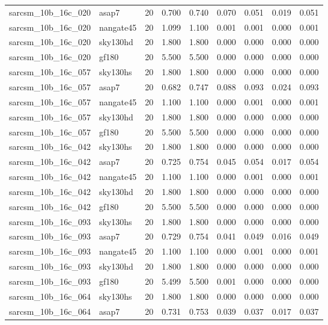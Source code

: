\begin{tabular}{llrrrrrrr}
sarcsm\_10b\_16c\_020 & asap7 & 20 & 0.700 & 0.740 & 0.070 & 0.051 & 0.019 & 0.051 \\
sarcsm\_10b\_16c\_020 & nangate45 & 20 & 1.099 & 1.100 & 0.001 & 0.001 & 0.000 & 0.001 \\
sarcsm\_10b\_16c\_020 & sky130hd & 20 & 1.800 & 1.800 & 0.000 & 0.000 & 0.000 & 0.000 \\
sarcsm\_10b\_16c\_020 & gf180 & 20 & 5.500 & 5.500 & 0.000 & 0.000 & 0.000 & 0.000 \\
sarcsm\_10b\_16c\_057 & sky130hs & 20 & 1.800 & 1.800 & 0.000 & 0.000 & 0.000 & 0.000 \\
sarcsm\_10b\_16c\_057 & asap7 & 20 & 0.682 & 0.747 & 0.088 & 0.093 & 0.024 & 0.093 \\
sarcsm\_10b\_16c\_057 & nangate45 & 20 & 1.100 & 1.100 & 0.000 & 0.001 & 0.000 & 0.001 \\
sarcsm\_10b\_16c\_057 & sky130hd & 20 & 1.800 & 1.800 & 0.000 & 0.000 & 0.000 & 0.000 \\
sarcsm\_10b\_16c\_057 & gf180 & 20 & 5.500 & 5.500 & 0.000 & 0.000 & 0.000 & 0.000 \\
sarcsm\_10b\_16c\_042 & sky130hs & 20 & 1.800 & 1.800 & 0.000 & 0.000 & 0.000 & 0.000 \\
sarcsm\_10b\_16c\_042 & asap7 & 20 & 0.725 & 0.754 & 0.045 & 0.054 & 0.017 & 0.054 \\
sarcsm\_10b\_16c\_042 & nangate45 & 20 & 1.100 & 1.100 & 0.000 & 0.001 & 0.000 & 0.001 \\
sarcsm\_10b\_16c\_042 & sky130hd & 20 & 1.800 & 1.800 & 0.000 & 0.000 & 0.000 & 0.000 \\
sarcsm\_10b\_16c\_042 & gf180 & 20 & 5.500 & 5.500 & 0.000 & 0.000 & 0.000 & 0.000 \\
sarcsm\_10b\_16c\_093 & sky130hs & 20 & 1.800 & 1.800 & 0.000 & 0.000 & 0.000 & 0.000 \\
sarcsm\_10b\_16c\_093 & asap7 & 20 & 0.729 & 0.754 & 0.041 & 0.049 & 0.016 & 0.049 \\
sarcsm\_10b\_16c\_093 & nangate45 & 20 & 1.100 & 1.100 & 0.000 & 0.001 & 0.000 & 0.001 \\
sarcsm\_10b\_16c\_093 & sky130hd & 20 & 1.800 & 1.800 & 0.000 & 0.000 & 0.000 & 0.000 \\
sarcsm\_10b\_16c\_093 & gf180 & 20 & 5.499 & 5.500 & 0.001 & 0.000 & 0.000 & 0.000 \\
sarcsm\_10b\_16c\_064 & sky130hs & 20 & 1.800 & 1.800 & 0.000 & 0.000 & 0.000 & 0.000 \\
sarcsm\_10b\_16c\_064 & asap7 & 20 & 0.731 & 0.753 & 0.039 & 0.037 & 0.017 & 0.037 \\

\end{tabular}

